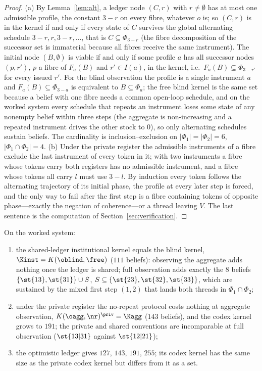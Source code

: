 \begin{proof}
(a) By Lemma~\ref{lem:alt}, a ledger node $(C,r)$ with $r\neq\emptyset$ has at most one admissible profile, the constant $3-r$ on every fibre, whatever $o$ is; so $(C,r)$ is in the kernel if and only if every state of $C$ survives the global alternating schedule $3-r,r,3-r,\dots$, that is $C\subseteq\Phi_{3-r}$ (the fibre decomposition of the successor set is immaterial because all fibres receive the same instrument). The initial node $(B,\emptyset)$ is viable if and only if some profile $a$ has all successor nodes $(p,r')$, $p$ a fibre of $F_a(B)$ and $r'\in I(a)$, in the kernel, i.e.\ $F_a(B)\subseteq\Phi_{3-r'}$ for every issued $r'$. For the blind observation the profile is a single instrument $a$ and $F_a(B)\subseteq\Phi_{3-a}$ is equivalent to $B\subseteq\Phi_a$; the free blind kernel is the same set because a belief with one fibre needs a common open-loop schedule, and on the worked system every schedule that repeats an instrument loses some state of any nonempty belief within three steps (the aggregate is non-increasing and a repeated instrument drives the other stock to $0$), so only alternating schedules sustain beliefs. The cardinality is inclusion--exclusion on $|\Phi_1|=|\Phi_2|=6$, $|\Phi_1\cap\Phi_2|=4$.
(b) Under the private register the admissible instruments of a fibre exclude the last instrument of every token in it; with two instruments a fibre whose tokens carry both registers has no admissible instrument, and a fibre whose tokens all carry $l$ must use $3-l$. By induction every token follows the alternating trajectory of its initial phase, the profile at every later step is forced, and the only way to fail after the first step is a fibre containing tokens of opposite phase---exactly the negation of coherence---or a thread leaving $V$.
The last sentence is the computation of Section~\ref{sec:verification}.
\end{proof}

\begin{corollary}\label{cor:conv}
On the worked system:
\begin{enumerate}[label=(\alph*),leftmargin=2em,itemsep=1pt]
\item the shared-ledger institutional kernel equals the blind kernel, $\Kinst=K(\oblind,\free)$ ($111$ beliefs): observing the aggregate adds nothing once the ledger is shared; full observation adds exactly the $8$ beliefs $\{\st{13},\st{31}\}\cup S$, $S\subseteq\{\st{23},\st{32},\st{33}\}$, which are sustained by the mixed first step $(1,2)$ that lands both threads in $\Phi_1\cap\Phi_2$;
\item under the private register the no-repeat protocol costs nothing at aggregate observation, $K(\oagg,\nr)^{\priv}=\Kagg$ ($143$ beliefs), and the codex kernel grows to $191$; the private and shared conventions are incomparable at full observation ($\st{13|31}$ against $\st{12|21}$);
\item the optimistic ledger gives $127$, $143$, $191$, $255$; its codex kernel has the same size as the private codex kernel but differs from it as a set.
\end{enumerate}
\end{corollary}

